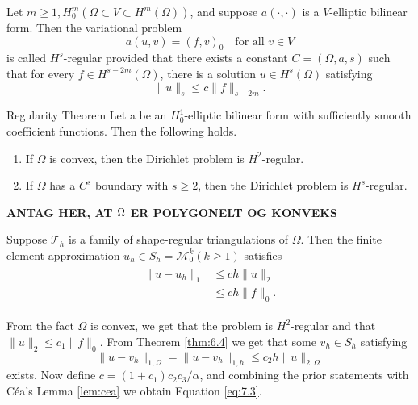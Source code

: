 \begin{defn}
    Let $m\geq 1, H^m_0(\Omega\subset V\subset H^m(\Omega))$, and suppose $a(\cdot,\cdot)$ is a $V$-elliptic bilinear form. 
    Then the variational problem
    \begin{equation}
        a(u,v) = (f,v)_0\quad \text{for all } v\in V
    \end{equation}
    is called $H^s$-regular provided that there exists a constant $C=(\Omega,a,s)$ such that for every  $f\in H^{s-2m}(\Omega)$,
    there is a solution $u\in H^s(\Omega)$ satisfying
    \begin{equation}
        \|u\|_s\leq c\|f\|_{s-2m}.
    \end{equation}
    \label{defn:7.1}
\end{defn}

\begin{thmx}{Regularity Theorem}
    Let a be an $H^1_0$-elliptic bilinear form with sufficiently smooth coefficient functions. Then the following holds. 
    \begin{enumerate}
        \item If $\Omega$ is convex, then the Dirichlet problem is $H^2$-regular. 
        \item If $\Omega$ has a $C^s$ boundary with $s\geq 2$, then the Dirichlet problem is $H^s$-regular.
    \end{enumerate}
\end{thmx}

\textbf{ANTAG HER, AT $\Omega$ ER POLYGONELT OG KONVEKS}

\begin{thmx}{\quad}
    Suppose $\mathcal{T}_h$ is a family of shape-regular triangulations of $\Omega$. Then the finite element approximation $u_h\in S_h = \mathcal{M}^k_0(k\geq 1)$ satisfies
    \begin{align}
        \begin{split}
            \|u-u_h\|_1&\leq ch\|u\|_2\ \\
            &\leq ch\|f\|_0.
        \end{split}
        \label{eq:7.3}
    \end{align}
\end{thmx}
\begin{bev}
    From the fact $\Omega$ is convex, we get that the problem is $H^2$-regular and that $\|u\|_2 \leq c_1\|f\|_0$.
    From Theorem \ref{thm:6.4} we get that some $v_h\in S_h$ satisfying 
    \begin{equation}
    \|u-v_h\|_{1,\Omega} = \|u-v_h\|_{1,h} \leq c_2h\|u\|_{2,\Omega}
    \end{equation}
    exists. Now define $c = (1+c_1)c_2c_3/\alpha$, and combining the prior statements with Céa's Lemma \ref{lem:cea} we obtain Equation \ref{eq:7.3}.
\end{bev}